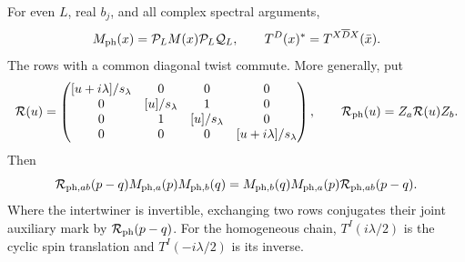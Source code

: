 \begin{lemma}\label{lem:row-algebra}
For even $L$, real $b_j$, and all complex spectral arguments,
\begin{equation}\label{eq:monodromy-gauge}
 M_{\rm ph}(x)=\mathcal P_L M(x)\mathcal P_L\mathcal Q_L,
 \qquad
 T^D(x)^*=T^{X\overline D X}(\bar x).
\end{equation}
The rows with a common diagonal twist commute.  More generally, put
\[
 \mathcal R(u)=
 \begin{pmatrix}
 [u+i\lambda]/s_\lambda&0&0&0\\
 0&[u]/s_\lambda&1&0\\
 0&1&[u]/s_\lambda&0\\
 0&0&0&[u+i\lambda]/s_\lambda
 \end{pmatrix},\qquad
 \mathcal R_{\rm ph}(u)=Z_a\mathcal R(u)Z_b.
\]
Then
\begin{equation}\label{eq:physical-RTT}
 \mathcal R_{{\rm ph},ab}(p-q)M_{{\rm ph},a}(p)M_{{\rm ph},b}(q)
 =M_{{\rm ph},b}(q)M_{{\rm ph},a}(p)
   \mathcal R_{{\rm ph},ab}(p-q).
\end{equation}
Where the intertwiner is invertible, exchanging two rows conjugates
their joint auxiliary mark by $\mathcal R_{\rm ph}(p-q)$.
For the homogeneous chain, $T^I(i\lambda/2)$ is the cyclic spin
translation and $T^I(-i\lambda/2)$ is its inverse.
\end{lemma}

